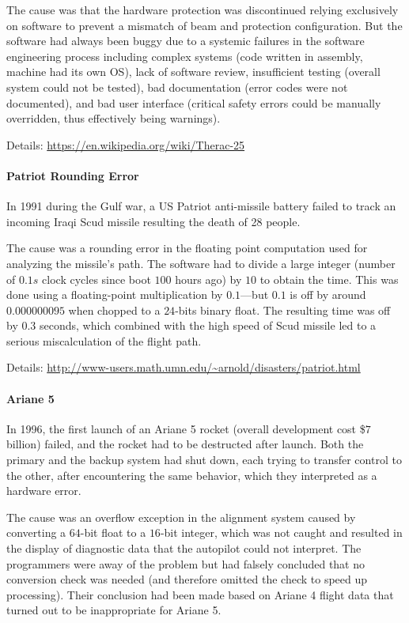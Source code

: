 The cause was that the hardware protection was discontinued relying exclusively on software to prevent a mismatch of beam and protection configuration.
But the software had always been buggy due to a systemic failures in the software engineering process including complex systems (code written in assembly, machine had its own OS), lack of software review, insufficient testing (overall system could not be tested), bad documentation (error codes were not documented), and bad user interface (critical safety errors could be manually overridden, thus effectively being warnings).

Details: \url{https://en.wikipedia.org/wiki/Therac-25}

\paragraph{Patriot Rounding Error}
In 1991 during the Gulf war, a US Patriot anti-missile battery failed to track an incoming Iraqi Scud missile resulting the death of 28 people.

The cause was a rounding error in the floating point computation used for analyzing the missile's path.
The software had to divide a large integer (number of $0.1s$ clock cycles since boot $100$ hours ago) by $10$ to obtain the time.
This was done using a floating-point multiplication by $0.1$---but $0.1$ is off by around $0.000000095$ when chopped to a $24$-bits binary float.
The resulting time was off by $0.3$ seconds, which combined with the high speed of Scud missile led to a serious miscalculation of the flight path.

Details: \url{http://www-users.math.umn.edu/~arnold/disasters/patriot.html}

\paragraph{Ariane 5}
In 1996, the first launch of an Ariane 5 rocket (overall development cost \$$7$ billion) failed, and the rocket had to be destructed after launch.
Both the primary and the backup system had shut down, each trying to transfer control to the other, after encountering the same behavior, which they interpreted as a hardware error.

The cause was an overflow exception in the alignment system caused by converting a $64$-bit float to a $16$-bit integer, which was not caught and resulted in the display of diagnostic data that the autopilot could not interpret.
The programmers were away of the problem but had falsely concluded that no conversion check was needed (and therefore omitted the check to speed up processing).
Their conclusion had been made based on Ariane 4 flight data that turned out to be inappropriate for Ariane 5.

